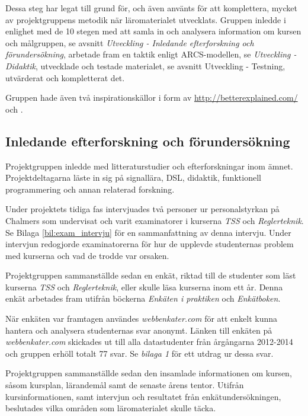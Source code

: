 \documentclass[]{article}
\begin{document}
Dessa steg har legat till grund för, och även använts för att komplettera, mycket av projektgruppens metodik när
läromaterialet utvecklats. Gruppen inledde i enlighet med de 10 stegen med att samla in och analysera information om
kursen och målgruppen, se avsnitt \textit{Utveckling - Inledande efterforskning och förundersökning}, arbetade fram en taktik
enligt ARCS-modellen, se \textit{Utveckling - Didaktik}, utvecklade och testade materialet, se avsnitt
{Utveckling - Testning}, utvärderat och kompletterat det.

Gruppen hade även två inspirationskällor i form av \url{http://betterexplained.com/} och \cite{learnyouahaskell}.


\subsection{Inledande efterforskning och förundersökning}

Projektgruppen inledde med litteraturstudier och efterforskningar inom ämnet. Projektdeltagarna läste in sig på
signallära, DSL, didaktik, funktionell programmering och annan relaterad forskning.

Under projektets tidiga fas intervjuades två personer ur personalstyrkan på Chalmers
som undervisat och varit examinatorer i kurserna \textit{TSS} och
\textit{Reglerteknik}.
Se Bilaga \ref{bil:exam_intervju} för en sammanfattning
av denna intervju. Under intervjun redogjorde examinatorerna för hur de upplevde
studenternas problem med kurserna och vad de trodde var orsaken.

Projektgruppen sammanställde sedan en enkät, riktad till de studenter som läst kurserna \textit{TSS} och
\textit{Reglerteknik}, eller skulle läsa kurserna inom ett år. Denna enkät arbetades fram utifrån böckerna
\textit{Enkäten i praktiken} och \textit{Enkätboken}.

När enkäten var framtagen användes \textit{webbenkater.com} för att enkelt kunna hantera och analysera studenternas svar
anonymt.
Länken till enkäten på \textit{webbenkater.com} skickades ut till alla datastudenter från
årgångarna 2012-2014 och gruppen erhöll totalt 77 svar.  Se \textit{bilaga 1} för ett utdrag ur dessa svar.

Projektgruppen sammanställde sedan den insamlade informationen om kursen, såsom kursplan, lärandemål samt de senaste
årens tentor. Utifrån kursinformationen, samt intervjun och resultatet från enkätundersökningen, beslutades vilka
områden som läromaterialet skulle täcka.
\end{document}
